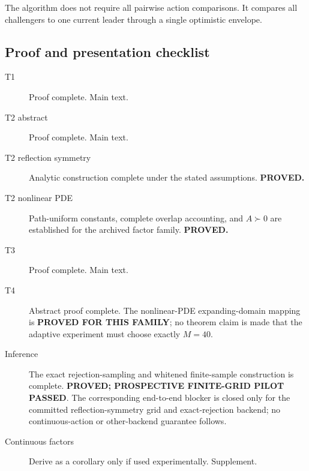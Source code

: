 The algorithm does not require all pairwise action comparisons.  It compares all
challengers to one current leader through a single optimistic envelope.

\subsection{Proof and presentation checklist}

\begin{description}
    \item[T1] Proof complete.  Main text.
    \item[T2 abstract] Proof complete.  Main text.
    \item[T2 reflection symmetry] Analytic construction complete under the
          stated assumptions.  \textbf{PROVED.}
    \item[T2 nonlinear PDE] Path-uniform constants, complete overlap accounting,
          and $A\succ0$ are established for the archived factor family.
          \textbf{PROVED.}
    \item[T3] Proof complete.  Main text.
    \item[T4] Abstract proof complete.  The nonlinear-PDE expanding-domain
          mapping is \textbf{PROVED FOR THIS FAMILY}; no theorem claim is made
          that the adaptive experiment must choose exactly $M=40$.
    \item[Inference] The exact rejection-sampling and whitened finite-sample
          construction is complete.  \textbf{PROVED; PROSPECTIVE FINITE-GRID
          PILOT PASSED}.  The corresponding end-to-end blocker is closed only
          for the committed reflection-symmetry grid and exact-rejection
          backend; no continuous-action or other-backend guarantee follows.
    \item[Continuous factors] Derive as a corollary only if used experimentally.
          Supplement.
\end{description}
